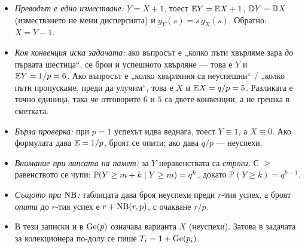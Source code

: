 \begin{itemize}\itemsep2pt
  \item \emph{Преводът е едно изместване:} $Y = X + 1$, тоест $\mathbb{E} Y = \mathbb{E} X + 1$,
        $\mathbb{D} Y = \mathbb{D} X$ (изместването не мени дисперсията) и $g_Y(s) = s\,g_X(s)$.
        Обратно: $X = Y - 1$.
  \item \emph{Коя конвенция иска задачата:} ако въпросът е „колко пъти хвърляме зара
        \emph{до} първата шестица“, се брои и успешното хвърляне — това е $Y$ и
        $\mathbb{E} Y = 1/p = 6$. Ако въпросът е „колко хвърляния са неуспешни“ / „колко пъти
        пропускаме, преди да улучим“, това е $X$ и $\mathbb{E} X = q/p = 5$. Разликата е точно
        единица, така че отговорите $6$ и $5$ са двете конвенции, а не грешка в сметката.
  \item \emph{Бърза проверка:} при $p = 1$ успехът идва веднага, тоест $Y \equiv 1$, а
        $X \equiv 0$. Ако формулата дава $\mathbb{E} = 1/p$, броят се опити; ако дава $q/p$ —
        неуспехи.
  \item \emph{Внимание при липсата на памет:} за $Y$ неравенствата са \emph{строги}.
        С $\ge$ равенството се чупи: $\mathbb{P}(Y \ge m+k \mid Y \ge m) = q^{k}$, докато
        $\mathbb{P}(Y \ge k) = q^{k-1}$.
  \item \emph{Същото при $\operatorname{NB}$:} таблицата дава броя неуспехи преди $r$-тия успех, а
        броят \emph{опити} до $r$-тия успех е $r + \operatorname{NB}(r,p)$, с очакване $r/p$.
  \item В тези записки и в  $\operatorname{Ge}(p)$ означава варианта $X$
        (неуспехи). Затова в задачата за колекционера по-долу се пише $T_i = 1 + \operatorname{Ge}(p_i)$.
\end{itemize}

